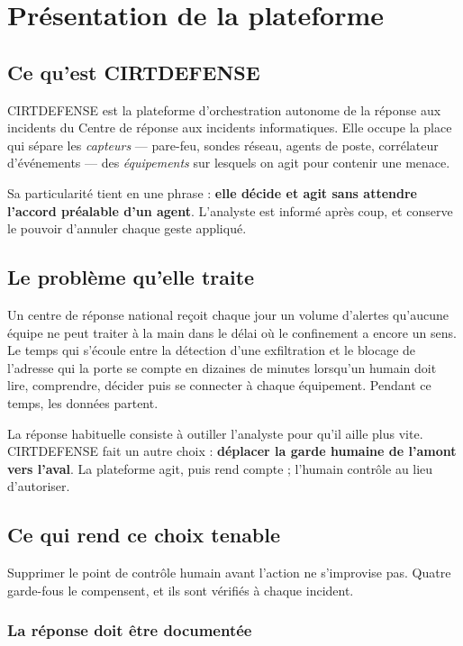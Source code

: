 \chapter{Présentation de la plateforme}
\minitoc

\section{Ce qu'est CIRTDEFENSE}

CIRTDEFENSE est la plateforme d'orchestration autonome de la réponse aux
incidents du Centre de réponse aux incidents informatiques. Elle occupe la
place qui sépare les \emph{capteurs} — pare-feu, sondes réseau, agents de
poste, corrélateur d'événements — des \emph{équipements} sur lesquels on agit
pour contenir une menace.

Sa particularité tient en une phrase : \textbf{elle décide et agit sans
attendre l'accord préalable d'un agent}. L'analyste est informé après coup, et
conserve le pouvoir d'annuler chaque geste appliqué.

\section{Le problème qu'elle traite}

Un centre de réponse national reçoit chaque jour un volume d'alertes qu'aucune
équipe ne peut traiter à la main dans le délai où le confinement a encore un
sens. Le temps qui s'écoule entre la détection d'une exfiltration et le blocage
de l'adresse qui la porte se compte en dizaines de minutes lorsqu'un humain
doit lire, comprendre, décider puis se connecter à chaque équipement. Pendant
ce temps, les données partent.

La réponse habituelle consiste à outiller l'analyste pour qu'il aille plus
vite. CIRTDEFENSE fait un autre choix : \textbf{déplacer la garde humaine de
l'amont vers l'aval}. La plateforme agit, puis rend compte ; l'humain contrôle
au lieu d'autoriser.

\section{Ce qui rend ce choix tenable}

Supprimer le point de contrôle humain avant l'action ne s'improvise pas. Quatre
garde-fous le compensent, et ils sont vérifiés à chaque incident.

\subsection{La réponse doit être documentée}

